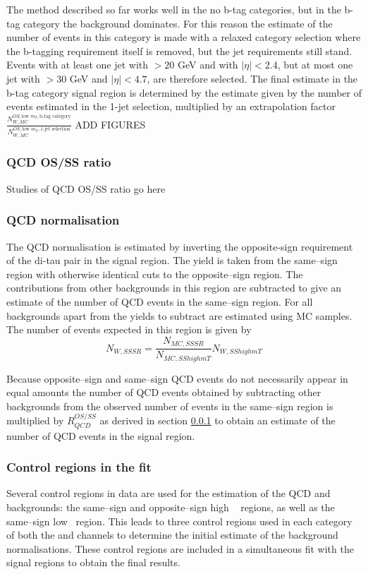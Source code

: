 The method described so far works well in the no b-tag categories, but in the b-tag category
the \ttbar background dominates. For this reason the estimate of the number
of \Wjets events in this category is made with a relaxed category selection where the b-tagging
requirement itself is removed, but the jet requirements still stand. Events with at least one 
jet with \pT$>20$ GeV and with $|\eta|<2.4$, but at most one jet with \pT$>30$ GeV and $|\eta|<4.7$, are therefore selected. The final \Wjets estimate in the b-tag category signal
region is determined by the estimate given by the number of \Wjets events
estimated in the 1-jet selection, multiplied by an extrapolation factor 
$\frac{N_{W,MC}^{OS,\text{low } m_{T},\text{b-tag category}}}{N_{W,MC}^{OS,\text{low }m_{\text{T}},\text{1-jet selection}}}$ ADD FIGURES

\subsubsection{QCD OS/SS ratio}
\label{sec:mssm_bkgs_etmt_qcdosss}
Studies of QCD OS/SS ratio go here

\subsubsection{QCD normalisation}
\label{sec:mssm_bkgs_etmt_qcdnorm}
The QCD normalisation is estimated by inverting the opposite-sign requirement
of the di-tau pair in the signal region. The yield is taken from the same--sign
region with otherwise identical cuts to the opposite--sign region. The contributions
from other backgrounds in this region are subtracted to give an estimate of the number
of QCD events in the same--sign region. For all backgrounds apart from \Wjets the
yields to subtract are estimated using \ac{MC} samples. The number of \Wjets events
expected in this region is given by
\begin{equation}\label{eqn:wjets_qcdsub}
N_{W,SS SR} = \frac{N_{MC,SS SR}}{N_{MC,SS high mT}}N_{W,SS high mT}
\end{equation}

Because opposite--sign and same--sign QCD events do not
necessarily appear in equal amounts the number of QCD
events obtained by subtracting other backgrounds from the
observed number of events in the same--sign region is multiplied
by $R_{QCD}^{OS/SS}$ as derived in section \ref{sec:mssm_bkgs_etmt_qcdosss} 
to obtain an estimate of the number of QCD events in the signal region.

\subsubsection{Control regions in the fit}
\label{sec:mssm_bkgs_etmt_ctrl}
Several control regions in data are used for the estimation
of the QCD and \Wjets backgrounds: the same--sign and 
opposite--sign high \mT~ regions, as well as the same--sign
low \mT~region. This leads to three control regions used 
in each category of both the \mutau and \etau channels to determine
the initial estimate of the background normalisations.
These control regions are included in a simultaneous fit
with the signal regions to obtain the final results.


